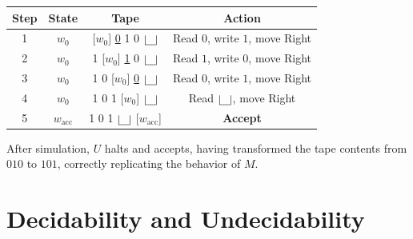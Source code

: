 \documentclass[12pt,a4paper,openany]{article}
\begin{document}
\begin{center}
\end{center}


\begin{center}
\begin{tabular}{c|c|c|c}
    \textbf{Step} & \textbf{State} & \textbf{Tape} & \textbf{Action} \\
    \hline
    1 & \(w_0\) & [\(w_0\)] \underline{0} 1 0 \(\scalebox{2.5}{\textvisiblespace}\) & Read \(0\), write \(1\), move Right \\
    2 & \(w_0\) & 1 [\(w_0\)] \underline{1} 0 \(\scalebox{2.5}{\textvisiblespace}\) & Read \(1\), write \(0\), move Right \\
    3 & \(w_0\) & 1 0 [\(w_0\)] \underline{0} \(\scalebox{2.5}{\textvisiblespace}\) & Read \(0\), write \(1\), move Right \\
    4 & \(w_0\) & 1 0 1 [\(w_0\)] \underline{\(\scalebox{2.5}{\textvisiblespace}\)} & Read \(\scalebox{2.5}{\textvisiblespace}\), move Right \\
    5 & \(w_{\text{acc}}\) & 1 0 1 \(\scalebox{2.5}{\textvisiblespace}\) [\(w_{\text{acc}}\)] & \textbf{Accept} \\
\end{tabular}
\end{center}

After simulation, \(U\) halts and accepts, having transformed the tape contents from \(010\) to \(101\),
correctly replicating the behavior of \(M\).

\section{Decidability and Undecidability}
\end{document}
